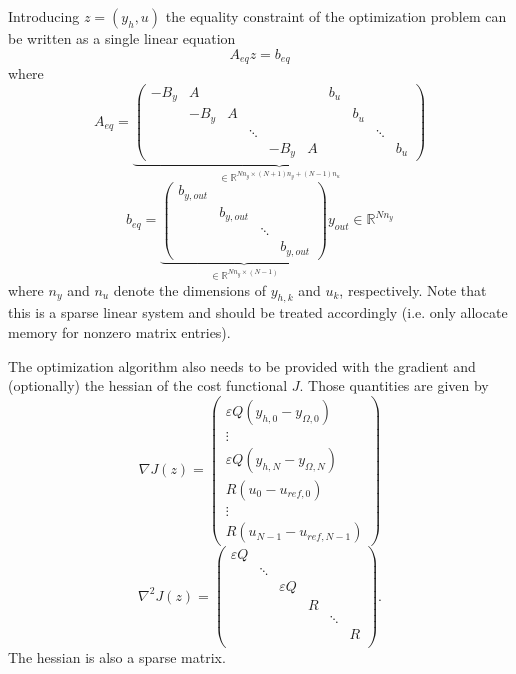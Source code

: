 \documentclass[
12pt, %
a4paper, %
onecolumn, %
portrait %
]{article}
\begin{document}
Introducing $z = (y_h, u)$ the equality constraint of the optimization problem can be written as a single linear equation 
\begin{equation}
A_{eq} z = b_{eq}
\label{eq:linear-system-constraints}
\end{equation}
where
\begin{equation}
A_{eq} =
\underbrace{\begin{pmatrix}
-B_y & A & & & & & b_u & & \\
& - B_y & A & & & & & b_u & \\
& & & \ddots & & & & & \ddots \\
& & & & -B_y & A & & & & b_u
\end{pmatrix}}_{
\in \mathbb{R}^{N n_y \times (N+1) n_y + (N-1) n_u}}
\end{equation}
\begin{equation}
b_{eq} = 
\underbrace{\begin{pmatrix}
b_{y,out} & & & \\
& b_{y,out} & &  \\
& & \ddots & \\
& & & b_{y,out}
\end{pmatrix}}_{
\in \mathbb{R}^{N n_y \times (N-1)}
}
 y_{out} \in \mathbb{R}^{N n_y}
\end{equation}
where $n_y$ and $n_u$ denote the dimensions of $y_{h,k}$ and $u_k$, respectively.
Note that this is a sparse linear system and should be treated accordingly (i.e. only allocate memory for nonzero matrix entries).

The optimization algorithm also needs to be provided with the gradient and (optionally) the hessian of the cost functional $J$. Those quantities are given by
\begin{equation}
\nabla J(z) = 
\begin{pmatrix}
\varepsilon Q (y_{h,0} - y_{\Omega,0}) \\
\vdots \\
\varepsilon Q (y_{h,N} - y_{\Omega,N}) \\
R (u_0 - u_{ref,0}) \\
\vdots \\
R (u_{N-1} - u_{ref,N-1})
\end{pmatrix}
\end{equation}
\begin{equation}
\nabla^2 J(z) = 
\begin{pmatrix}
\varepsilon Q & & & & &\\
& \ddots & & & &\\
& & \varepsilon Q & & &\\
& & & R & &\\
& & & & \ddots & \\
& & & & & R \\
\end{pmatrix}.
\end{equation}
The hessian is also a sparse matrix.
\end{document}
